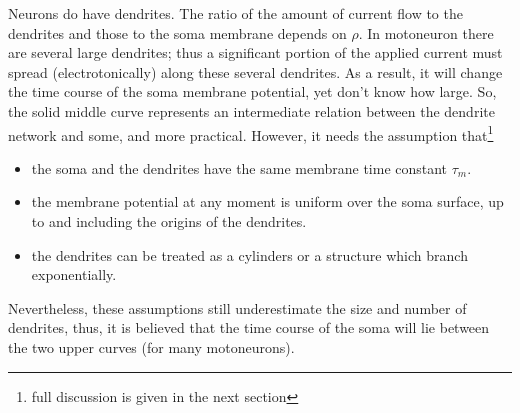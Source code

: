\begin{enumerate}
  Neurons do have dendrites. The ratio of the amount of current flow
  to the dendrites and those to the soma membrane depends on
  $\rho$. In motoneuron there are several large dendrites; thus a
  significant portion of the applied current must spread
  (electrotonically) along these several dendrites. As a result, it
  will change the time course of the soma membrane potential, yet
  don't know how large. %
  So, the solid middle curve represents an intermediate relation
  between the dendrite network and some, and more practical. However,
  it needs the assumption that\footnote{full discussion is given in
    the next section}
  \begin{itemize}
  \item the soma and the dendrites have the same membrane time
    constant $\tau_m$.
  \item the membrane potential at any moment is uniform over the soma
    surface, up to and including the origins of the dendrites.
  \item the dendrites can be treated as a cylinders or a structure
    which branch exponentially.
  \end{itemize}
  Nevertheless, these assumptions still underestimate the size and
  number of dendrites, thus, it is believed that the time course of
  the soma will lie between the two upper curves (for many
  motoneurons).

\end{enumerate}










